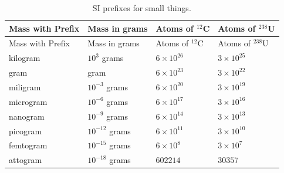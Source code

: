 \documentclass[
  letterpaper,
  DIV=11,
  numbers=noendperiod]{scrreprt}
\begin{document}
\begin{longtable}[]{@{}
  >{\raggedright\arraybackslash}p{}
  >{\raggedright\arraybackslash}p{}
  >{\raggedright\arraybackslash}p{}
  >{\raggedright\arraybackslash}p{}@{}}
\caption{SI prefixes for small things.}\tabularnewline
\toprule\noalign{}
\begin{minipage}[b]{\linewidth}\raggedright
Mass with Prefix
\end{minipage} & \begin{minipage}[b]{\linewidth}\raggedright
Mass in grams
\end{minipage} & \begin{minipage}[b]{\linewidth}\raggedright
Atoms of \(^{12}\)C
\end{minipage} & \begin{minipage}[b]{\linewidth}\raggedright
Atoms of \(^{238}\)U
\end{minipage} \\
\midrule\noalign{}
\endfirsthead
\toprule\noalign{}
\begin{minipage}[b]{\linewidth}\raggedright
Mass with Prefix
\end{minipage} & \begin{minipage}[b]{\linewidth}\raggedright
Mass in grams
\end{minipage} & \begin{minipage}[b]{\linewidth}\raggedright
Atoms of \(^{12}\)C
\end{minipage} & \begin{minipage}[b]{\linewidth}\raggedright
Atoms of \(^{238}\)U
\end{minipage} \\
\midrule\noalign{}
\endhead
\bottomrule\noalign{}
\endlastfoot
kilogram & \(10^3\) grams & \(6 \times 10^{26}\) &
\(3 \times 10^{25}\) \\
gram & 1 gram & \(6 \times 10^{23}\) & \(3 \times 10^{22}\) \\
miligram & \(10^{-3}\) grams & \(6 \times 10^{20}\) &
\(3 \times 10^{19}\) \\
microgram & \(10^{-6}\) grams & \(6 \times 10^{17}\) &
\(3 \times 10^{16}\) \\
nanogram & \(10^{-9}\) grams & \(6 \times 10^{14}\) &
\(3 \times 10^{13}\) \\
picogram & \(10^{-12}\) grams & \(6 \times 10^{11}\) &
\(3 \times 10^{10}\) \\
femtogram & \(10^{-15}\) grams & \(6 \times 10^{8}\) &
\(3 \times 10^{7}\) \\
attogram & \(10^{-18}\) grams & \(602214\) & \(30357\) \\
\end{longtable}
\end{document}
